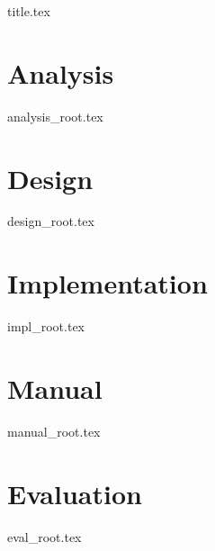 \documentclass[a4paper, 12pt]{scrartcl}
\begin{document}
{title.tex}

\clearpage
\thispagestyle{empty}

\tableofcontents

\pagebreak

\section{Analysis}
{analysis_root.tex}
\pagebreak

\section{Design}
{design_root.tex}
\pagebreak

\section{Implementation}
{impl_root.tex}
\pagebreak

\section{Manual}
{manual_root.tex}
\pagebreak

\section{Evaluation}
{eval_root.tex}
\pagebreak
\end{document}
